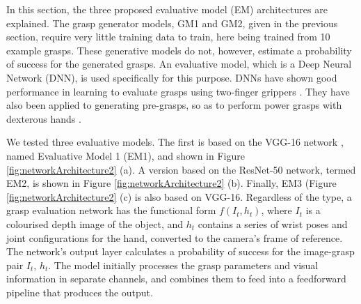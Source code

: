 In this section, the three proposed evaluative model (EM) architectures are explained. The grasp generator models, GM1 and GM2, given in the previous section, require very little training data to train, here being trained from 10 example grasps. %
These generative models do not, however, estimate a probability of success for the generated grasps. An evaluative model, which is a Deep Neural Network (DNN), is used specifically for this purpose. DNNs have shown good performance in learning to evaluate grasps using two-finger grippers \cite{levine16,lenz2015deep}. They have also been applied to generating pre-grasps, so as to perform power grasps with dexterous hands \cite{varley2015generating,lu2017planning}.


We tested three evaluative models. The first is based on the VGG-16 network \cite{Simonyan14c}, named Evaluative Model 1 (EM1), and shown in Figure \ref{fig:networkArchitecture2} (a). A version based on the ResNet-50 network, termed EM2, is shown in Figure \ref{fig:networkArchitecture2} (b). Finally, EM3 (Figure \ref{fig:networkArchitecture2} (c) is also based on VGG-16. Regardless of the type, a grasp evaluation network has the functional form $f(I_t, h_t)$, where $I_t$ is a colourised depth image of the object, and $h_t$ contains a series of wrist poses and joint configurations for the hand, converted to the camera's frame of reference. The network's output layer calculates a probability of success for the image-grasp pair $I_t$, $h_t$. The model initially processes the grasp parameters and visual information in separate channels, and combines them to feed into a feedforward pipeline that produces the output. 

